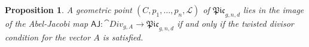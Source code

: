 \documentclass[a4paper,12pt]{article} %
\def\cM{{\mathcal{M}}}
\def\HH{\mathcal{H}}
\theoremstyle{definition}
\theoremstyle{plain}%
\newtheorem{proposition}[definition]{Proposition}
\newcommand{\aj}{{\scriptstyle \mathsf{AJ}}}
\newcommand{\Picabs}{\mathfrak{Pic}}
\begin{document}
\begin{proposition}\label{prop:aj_image}
A geometric point $(C,p_1, \ldots, p_n, \mathcal{L})$ of $\Picabs_{g,n,d}$ lies in the image of the Abel-Jacobi map $\aj \colon \cat{Div}_{g,A} \to \Picabs_{g,n,d}$ if and only if the twisted divisor condition for the vector $A$ is satisfied.
\end{proposition}













\end{document}
